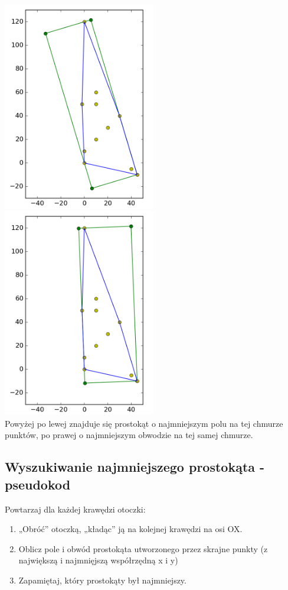 \documentclass[hidelinks]{article}
\begin{document}
\includegraphics[width=0.5\textwidth]{pics/area.png}
\includegraphics[width=0.5\textwidth]{pics/perim.png}
\newline \\
Powyżej po lewej znajduje się prostokąt o najmniejszym polu na tej chmurze punktów, po prawej o najmniejszym obwodzie na tej samej chmurze.

\newpage

\subsection{Wyszukiwanie najmniejszego prostokąta - pseudokod}

Powtarzaj dla każdej krawędzi otoczki:
\begin{enumerate}
\item „Obróć” otoczką, „kładąc” ją na kolejnej krawędzi na osi OX.
\item Oblicz pole i obwód prostokąta utworzonego przez skrajne punkty (z największą i najmnięjszą współrzędną x i y)
\item Zapamiętaj, który prostokąty był najmniejszy.
\end{enumerate}
\end{document}
